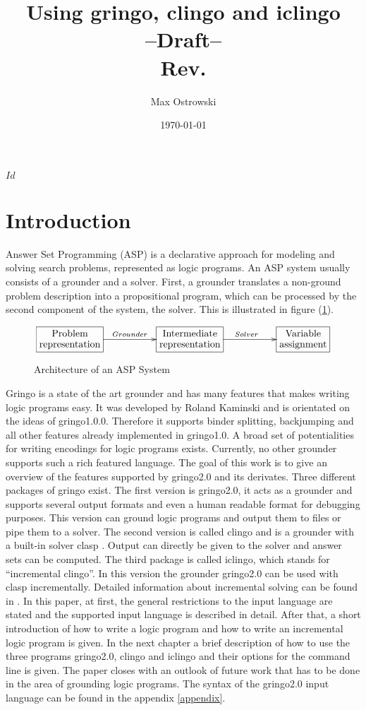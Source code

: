 \documentclass[a4paper,10pt]{article}
\author{Max Ostrowski}
\title{Using gringo, clingo and iclingo\\--Draft--\\Rev.\svnInfoRevision}
\date{\today}
\begin{document}
\svnInfo $Id$
\maketitle

\tableofcontents
\section{Introduction}
Answer Set Programming (ASP) \cite{baral02a} is a declarative approach for modeling and solving search problems, represented as logic programs.
An ASP system usually consists of a grounder and a solver.
First, a grounder translates a non-ground problem description into a propositional program, which can be processed by the second component of the system, the solver. This is illustrated in figure (\ref{fig:ASP}).
\begin{figure}[h]
\[
\xymatrix{*+[F]\txt{Problem\\representation}\ar[rr]^{Grounder}&&
		*+[F]\txt{Intermediate\\ representation} \ar[rr]^{Solver}&&
		*+[F]\txt{Variable\\ assignment}}
\]
\caption{Architecture of an ASP System}
\label{fig:ASP}
\end{figure}
Gringo is a state of the art grounder and has many features that makes writing logic programs easy.
It was developed by Roland Kaminski and is orientated on the ideas of gringo1.0.0\cite{gringopaper}.
Therefore it supports binder splitting, backjumping and all other features already implemented in gringo1.0.
A broad set of potentialities for writing encodings for logic programs exists. Currently, no other grounder supports such a rich featured language.
The goal of this work is to give an overview of the features supported by gringo2.0 and its derivates.
Three different packages of gringo exist.
The first version is gringo2.0, it acts as a grounder and supports several output formats and even a human readable format for debugging purposes. This version can ground logic programs and output them to files or pipe them to a solver.
The second version is called clingo and is a grounder with a built-in solver clasp \cite{gekanesc07b}.
Output can directly be given to the solver and answer sets can be computed.
The third package is called iclingo, which stands for ``incremental clingo''. In this version the grounder gringo2.0 can be used with clasp incrementally. Detailed information about incremental solving can be found in \cite{gekaosscth08a}.
In this paper, at first, the general restrictions to the input language are stated and the supported input language is described in detail. After that, a short introduction of how to write a logic program and how to write an incremental logic program is given. In the next chapter a brief description of how to use the three programs gringo2.0, clingo and iclingo and their options for the command line is given. The paper closes with an outlook of future work that has to be done in the area of grounding logic programs.
The syntax of the gringo2.0 input language can be found in the appendix \ref{appendix}.
\end{document}
